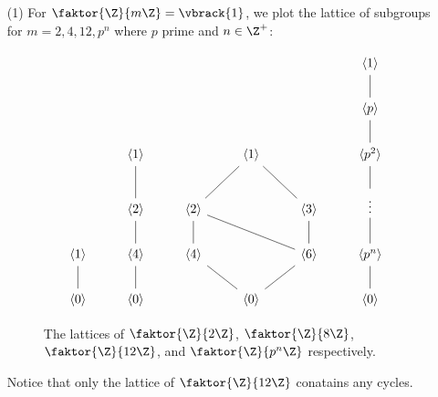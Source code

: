 \begin{example}
    \begin{enumerate}
        \item[(1)] For $\faktor{\Z}{m\Z}=\vbrack{1}$, we plot the lattice of
            subgroups for $m=2,4,12, p^n$ where $p$ prime and $n \in \Z^+$:
            \begin{figure}[h]
\[\begin{tikzcd}
	&&&&& {\langle 1 \rangle} \\
	&&&&& {\langle p \rangle} \\
	& {\langle 1 \rangle} && {\langle 1 \rangle} && {\langle p^2 \rangle} \\
	& {\langle 2 \rangle} & {\langle 2 \rangle} && {\langle 3 \rangle} & \vdots \\
	{\langle 1 \rangle} & {\langle 4 \rangle} & {\langle 4 \rangle} && {\langle 6 \rangle} & {\langle p^n \rangle} \\
	{\langle 0 \rangle} & {\langle 0 \rangle} && {\langle 0 \rangle} && {\langle 0 \rangle}
	\arrow[no head, from=5-1, to=6-1]
	\arrow[no head, from=5-2, to=4-2]
	\arrow[no head, from=4-2, to=3-2]
	\arrow[no head, from=4-3, to=5-3]
	\arrow[no head, from=5-3, to=6-4]
	\arrow[no head, from=6-4, to=5-5]
	\arrow[no head, from=5-5, to=4-5]
	\arrow[no head, from=4-5, to=3-4]
	\arrow[no head, from=3-4, to=4-3]
	\arrow[no head, from=4-3, to=5-5]
	\arrow[no head, from=6-2, to=5-2]
	\arrow[no head, from=2-6, to=3-6]
	\arrow[no head, from=3-6, to=4-6]
	\arrow[no head, from=4-6, to=5-6]
	\arrow[no head, from=5-6, to=6-6]
	\arrow[no head, from=1-6, to=2-6]
\end{tikzcd}\]
                \caption{The lattices of $\faktor{\Z}{2\Z}$, $\faktor{\Z}{8\Z}$,
                $\faktor{\Z}{12\Z}$, and  $\faktor{\Z}{p^n\Z}$ respectively.}
                \label{fig_2.1}
            \end{figure}
            Notice that only the lattice of $\faktor{\Z}{12\Z}$ conatains any
            cycles.


\end{enumerate}
\end{example}
